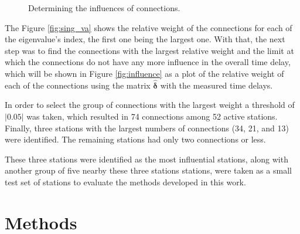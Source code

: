 \documentclass[12pt, sumlimits, intlimits]{article}
\begin{document}
\begin{figure}[ht] 
	\centering 
	\caption{Determining the influences of connections.}
	\label{fig:connectioninfluence}
\end{figure}

The Figure \ref{fig:sing_va} shows the relative weight of the connections for each of the eigenvalue's index, the first one being the largest one. With that, the next step was to find the connections with the largest relative weight and the limit at which the connections do not have any more influence in the overall time delay, which will be shown in Figure \ref{fig:influence} as a plot of the relative weight of each of the connections using the matrix $\bm{\hat{\delta}}$ with the measured time delays.

In order to select the group of connections with the largest weight a threshold of $|0.05|$ was taken, which resulted in 74 connections among 52 active stations. Finally, three stations with the largest numbers of connections (34, 21, and 13) were identified. The remaining stations had only two connections or less. 

These three stations were identified as the most influential stations, along with another group of five nearby these three stations stations, were taken as a small test set of stations to evaluate the methods developed in this work. 

\section{Methods}
\end{document}
